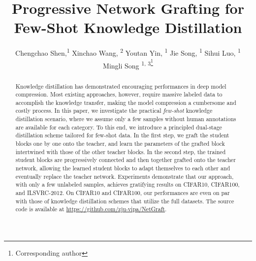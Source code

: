 \documentclass[letterpaper]{article} %
\title{Progressive Network Grafting for Few-Shot Knowledge Distillation}
\author {
    Chengchao Shen,\textsuperscript{\rm 1}
    Xinchao Wang, \textsuperscript{\rm 2}
    Youtan Yin, \textsuperscript{\rm 1}
    Jie Song, \textsuperscript{\rm 1}
    Sihui Luo, \textsuperscript{\rm 1} \\
    Mingli Song \textsuperscript{\rm 1, 3\thanks{Corresponding author}} \\
}
\begin{document}
\maketitle

\begin{abstract}
Knowledge distillation has demonstrated encouraging performances in deep model compression.
Most existing approaches, however, require massive labeled data to accomplish the knowledge transfer,  making the model compression a cumbersome and costly process.
In this paper, we investigate the practical \emph{few-shot} knowledge distillation scenario,
where we assume only a few samples without human annotations
are available for each category.
To this end, we introduce a principled dual-stage distillation
scheme tailored for few-shot data. In the first step, we
graft the student blocks one by one onto the teacher,
and learn the parameters of the grafted block
intertwined with those of the other teacher blocks.
In the second step, the trained student blocks are progressively connected and then together grafted onto the teacher network, allowing the learned student blocks to adapt themselves to each other and eventually replace the teacher network.
Experiments demonstrate that our approach,
with only a few unlabeled samples,
achieves gratifying results on CIFAR10, CIFAR100, and ILSVRC-2012.
On CIFAR10 and CIFAR100, our performances are even
on par with those of knowledge distillation schemes
that utilize the full datasets.
The source code is available at \url{https://github.com/zju-vipa/NetGraft}.
\end{abstract}
\end{document}
